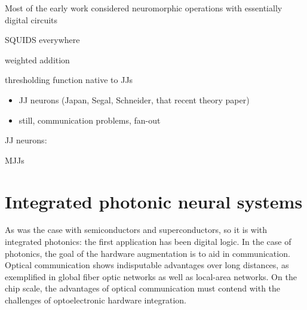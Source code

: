 \documentclass[twocolumn]{article}
\begin{document}
Most of the early work considered neuromorphic operations with essentially digital circuits

SQUIDS everywhere

weighted addition

thresholding function native to JJs

\begin{itemize}
\item JJ neurons (Japan, Segal, Schneider, that recent theory paper)
\item still, communication problems, fan-out
\end{itemize}

JJ neurons:
\cite{hias2007}
\cite{crsc2010}
\cite{segu2014}
\cite{sele2017}

MJJs
\cite{vevi2013}
\cite{ru2016}
\cite{scdo2018}

\section{\label{sec:integratedPhotonics}Integrated photonic neural systems}
As was the case with semiconductors and superconductors, so it is with integrated photonics: the first application has been digital logic. In the case of photonics, the goal of the hardware augmentation is to aid in communication. Optical communication shows indisputable advantages over long distances, as exemplified in global fiber optic networks as well as local-area networks. On the chip scale, the advantages of optical communication must contend with the challenges of optoelectronic hardware integration. 
\end{document}
